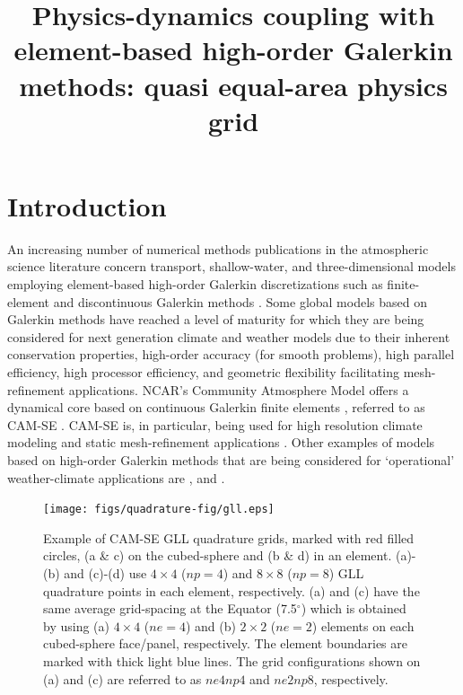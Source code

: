 \documentclass[twocol]{ametsoc}
\title{Physics-dynamics coupling with element-based high-order Galerkin methods: quasi equal-area physics grid}
\affiliation{Climate and Global Dynamics, National Center for Atmospheric Research, 1850 Table Mesa Drive, Boulder, Colorado, USA.}
\begin{document}
\maketitle


%

\section{Introduction}
An increasing number of numerical methods publications in the atmospheric science literature concern transport, shallow-water, and three-dimensional models employing element-based high-order Galerkin discretizations such as finite-element and discontinuous Galerkin methods \citep[for an introduction to these methods see, e.g., ][]{Durran,NLL2011LNCSE}. Some global models based on Galerkin methods have reached a level of maturity for which they are being considered for next generation climate and weather models due to their inherent conservation properties, high-order accuracy (for smooth problems), high parallel efficiency, high processor efficiency, and geometric flexibility facilitating mesh-refinement applications. NCAR's Community Atmosphere Model \citep[CAM; ][]{CAM5} offers a dynamical core based on continuous Galerkin finite elements \citep{TF2010JCP}, referred to as CAM-SE \citep[CAM Spectral Elements; ][]{DetAl2012IJHPCA,TES2008JPCS}. CAM-SE is, in particular, being used for high resolution climate modeling \citep[e.g., ][]{JAME:JAME20125} and static mesh-refinement applications \citep{FT2015MWR,ZJT2013,ZetAl2014JC,GetAl2014GMD}. Other examples of models based on high-order Galerkin methods that are being considered for `operational' weather-climate applications are \citet{Giraldo20083849}, \citet{Nair2009309} and \citet{BSBDK2013TCFD}.


\begin{figure}[t]
\noindent\texttt{[image: figs/quadrature-fig/gll.eps]}\\
\caption{Example of CAM-SE GLL quadrature grids, marked with red filled circles, (a \& c) on the cubed-sphere and (b \& d) in an element. (a)-(b) and (c)-(d) use $4\times 4$ ($np=4$) and $8\times 8$ ($np=8$) GLL quadrature points in each element, respectively. (a) and (c) have the same average grid-spacing at the Equator (7.5$^\circ$) which is obtained by using (a) $4\times 4$ ($ne=4$) and (b) $2\times 2$ ($ne=2$) elements on each cubed-sphere face/panel, respectively. The element boundaries are marked with thick light blue lines. The grid configurations shown on (a) and (c) are referred to as $ne4np4$ and $ne2np8$, respectively.}
\label{fig:gll-grids}
\end{figure}
\end{document}
